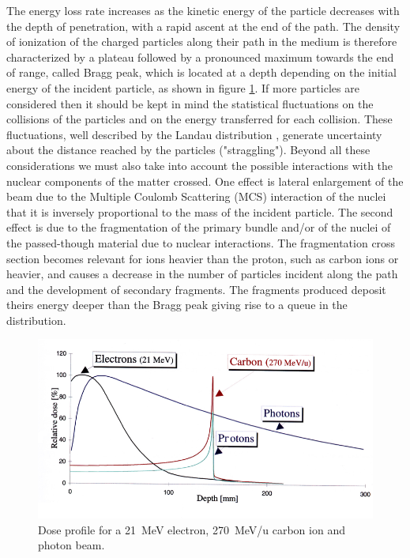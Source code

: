 The energy loss rate increases as the kinetic energy of the particle decreases with the depth of penetration, with a rapid ascent at the end of the path.
The density of ionization of the charged particles along their path in the medium is therefore characterized by a plateau followed by a pronounced maximum towards the end of range, called Bragg peak, which is located at a depth depending on the initial energy of the incident particle, as shown in figure \ref{fig:braggpeak}.
\newline
If more particles are considered then it should be kept in mind
the statistical fluctuations on the collisions of the particles and on the energy transferred for each collision.
These fluctuations, well described by the Landau distribution \cite{landau}, generate uncertainty about the distance reached by the particles ("straggling").
Beyond all these considerations we must also take into account the possible interactions with the nuclear components of the matter crossed.
One effect is lateral enlargement of the beam due to the Multiple Coulomb Scattering (MCS) interaction of the nuclei that it is inversely proportional to the mass of the incident particle.
The second effect is due to the fragmentation of the primary bundle and/or of the nuclei of the passed-though material due to nuclear interactions.
The fragmentation cross section becomes relevant for ions heavier than the proton, such as carbon ions or heavier, and causes a decrease in the number of particles incident along the path and the development of secondary fragments.
The fragments produced deposit theirs energy deeper than the Bragg peak giving rise to a queue in the distribution.
\begin{figure}[H]
	\centering
	\includegraphics[width=0.8\linewidth]{IMG/ch1/BraggPeak2}
	\caption{Dose profile for a 21~MeV electron, 270~MeV/u carbon ion and photon beam\cite{bragg}.}
	\label{fig:braggpeak}
\end{figure}  


